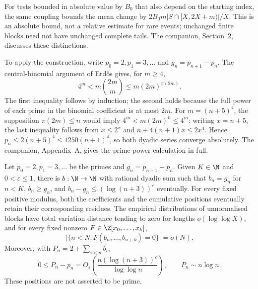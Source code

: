 \documentclass[11pt]{article}
\begin{document}
For tests bounded in absolute value by $B_0$ that also depend on the
starting index, the same coupling bounds the mean change by
$2B_0m|S\cap[X,2X+m)|/X$.  This is an absolute bound, not a relative
estimate for rare events; unchanged finite blocks need not have unchanged
complete tails.  The companion, Section~2, discusses these distinctions.

To apply the construction, write $p_0=2,p_1=3,\ldots$ and
$g_n=p_{n+1}-p_n$.  The central-binomial argument of Erd\H{o}s
\cite[pp.~194--196]{erdos1932} gives, for $m\ge4$,
\[
 4^m<m\binom{2m}{m}\le m(2m)^{\pi(2m)}.
\]
The first inequality follows by induction; the second holds because the
full power of each prime in the binomial coefficient is at most $2m$.
For $m=(n+5)^4$, the supposition $\pi(2m)\le n$ would imply
$4^m<m(2m)^n\le4^m$: writing $x=n+5$, the last inequality follows from
$x\le2^x$ and $n+4(n+1)x\le2x^4$.  Hence
$p_n\le2(n+5)^4\le1250(n+1)^4$, so both dyadic series converge absolutely.
The companion, Appendix~A, gives the prime-power calculation in full.

\begin{corollary}\label{res:jointcountermodel}
Let $p_0=2,p_1=3,\ldots$ be the primes and $g_n=p_{n+1}-p_n$.
Given $K\in\N$ and $0<\varepsilon\le1$, there is $b:\N\to\N$ with
rational dyadic sum such that $b_n=g_n$ for $n<K$, $b_n\ge g_n$, and
$b_n-g_n\le(\log(n+3))^\varepsilon$ eventually.  For every fixed positive
modulus, both the coefficients and the cumulative positions eventually
retain their corresponding residues.  The empirical distributions of
unnormalised blocks have total variation distance tending to zero
for lengths $o(\log\log X)$, and for every fixed nonzero
$F\in\Z[x_0,\ldots,x_k]$,
\[
 \bigl|\{n<N:F(b_n,\ldots,b_{n+k})=0\}\bigr|=o(N).
\]
Moreover, with $P_n=2+\sum_{i<n}b_i$,
\[
 0\le P_n-p_n=O_\varepsilon\!\left(
       \frac{n(\log(n+3))^\varepsilon}{\log\log n}\right),
 \qquad P_n\sim n\log n.
\]
These positions are not asserted to be prime.
\end{corollary}
\end{document}
